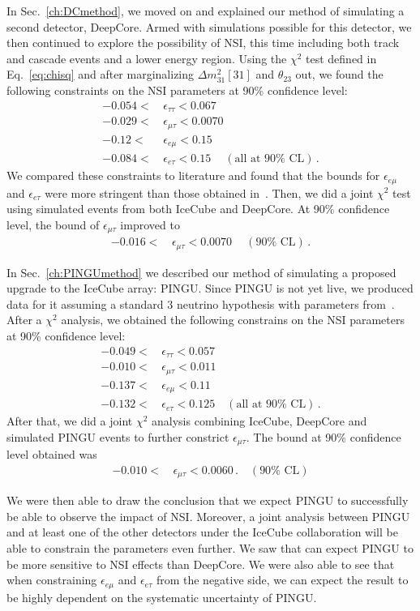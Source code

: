 \documentclass{article}
\newcommand{\emt}{\ensuremath{\epsilon_{\mu\tau}}}
\newcommand{\eet}{\epsilon_{e\tau}}
\newcommand{\eem}{\epsilon_{e\mu}}
\newcommand{\ett}{\ensuremath{\epsilon_{\tau\tau}}}
\newcommand{\dm}{\Delta m^2_{31}}
\begin{document}
{{In Sec.~\ref{ch:DCmethod}, we moved on and explained our method of simulating a second detector, DeepCore. Armed with simulations possible for this detector, we then continued to explore the possibility of NSI, this time including both track and cascade events and a lower energy region.
Using the $\chi^2$ test defined in Eq.~\ref{eq:chisq} and after marginalizing $\dm[31]$ and $\theta_{23}$ out, we found the following constraints on the NSI parameters at 90\% confidence level:
\begin{align}
    -0.054 <&\, \ett < 0.067 \nonumber \\
    -0.029 <&\, \emt < 0.0070 \nonumber \\
    -0.12 <&\, \eem < 0.15 \nonumber \\
    -0.084 <&\, \eet < 0.15\ \quad (\text{all at }90\% \text{ CL})\,.
 \end{align}
We compared these constraints to literature and found that the bounds for $\eem$ and $\eet$ were more stringent than those obtained in~\cite{demidov}.
Then, we did a joint $\chi^2$ test using simulated events from both IceCube and DeepCore. At 90\% confidence level, the bound of $\emt$ improved to
\begin{align}
    -0.016 <&\, \emt < 0.0070\ \quad (90\% \text{ CL})\,.
 \end{align}

In Sec.~\ref{ch:PINGUmethod} we described our method of simulating a proposed upgrade to the IceCube array: PINGU.
Since PINGU is not yet live, we produced data for it assuming a standard $3$ neutrino hypothesis with parameters from~\cite{nufit}.
After a $\chi^2$ analysis, we obtained the following constrains on the NSI parameters at 90\% confidence level:
\begin{align}
    -0.049 <&\, \ett < 0.057 \nonumber \\
    -0.010 <&\, \emt < 0.011 \nonumber \\
    -0.137 <&\, \eem < 0.11 \nonumber \\
    -0.132 <&\, \eet < 0.125 \quad (\text{all at }90\% \text{ CL})\,.
 \end{align}
After that, we did a joint $\chi^2$ analysis combining IceCube, DeepCore and simulated PINGU events to further constrict $\emt$. The bound at 90\% confidence level obtained was
\begin{align}
    -0.010 <&\, \emt < 0.0060\,. \quad (90\% \text{ CL})
 \end{align}

We were then able to draw the conclusion that we expect PINGU to successfully be able to observe the impact of NSI. Moreover, a joint analysis between PINGU and at least one of the other detectors under the IceCube collaboration
will be able to constrain the parameters even further. We saw that can expect PINGU to be more sensitive to NSI effects than DeepCore. We were also able to see that when constraining $\eem$ and $\eet$ from the negative side, 
we can expect the result to be highly dependent on the systematic uncertainty of PINGU.

}}
\end{document}
